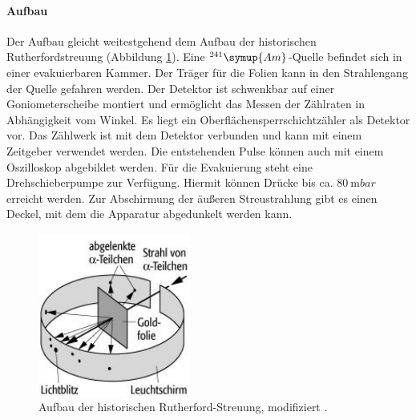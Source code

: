 \paragraph{Aufbau}
Der Aufbau gleicht weitestgehend dem Aufbau der historischen Rutherfordstreuung (Abbildung \ref{fig:aufbau}).
Eine $^{241}\symup{Am}$-Quelle befindet sich in einer evakuierbaren Kammer.
Der Träger für die Folien kann in den Strahlengang der Quelle gefahren werden.
Der Detektor ist schwenkbar auf einer Goniometerscheibe montiert und ermöglicht das Messen der Zählraten in Abhängigkeit vom Winkel.
Es liegt ein Oberflächensperrschichtzähler als Detektor vor.
Das Zählwerk ist mit dem Detektor verbunden und kann mit einem Zeitgeber verwendet werden.
Die entstehenden Pulse können auch mit einem Oszilloskop abgebildet werden.
Für die Evakuierung steht eine Drehschieberpumpe zur Verfügung.
Hiermit können Drücke bis ca. $\SI{80}{\milli bar}$ erreicht werden.
Zur Abschirmung der äußeren Streustrahlung gibt es einen Deckel, mit dem die Apparatur abgedunkelt werden kann.

\begin{figure}[h!]
  \centering
  \includegraphics[width=5cm]{images/aufbau_rutherfordstreuung.jpg}
  \caption{Aufbau der historischen Rutherford-Streuung, modifiziert \cite{aufbau}.}
  \label{fig:aufbau}
\end{figure}

\FloatBarrier

